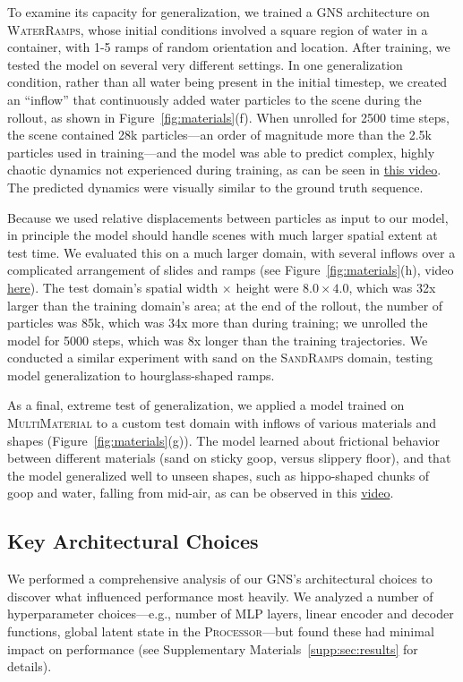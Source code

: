 \documentclass{article}
\newcommand\figref[1]{Figure~\ref{#1}}
\newcommand\domain[1]{\textsc{#1}}
\newcommand{\processor}{\textsc{Processor}}
\newcommand\vidgenvortex[1]{\href{http://tny.sh/tWNrMBg}{#1}}
\newcommand\vidgenramps[1]{\href{http://tny.sh/2fmmUfN}{#1}}
\newcommand\vidgenmulti[1]{\href{http://tny.sh/C0TUQH7}{#1}}
\begin{document}
To examine its capacity for generalization, we trained a GNS architecture on \domain{WaterRamps}, whose initial conditions involved a square region of water in a container, with 1-5 ramps of random orientation and location. After training, we tested the model on several very different settings. In one generalization condition, rather than all water being present in the initial timestep, we created an ``inflow'' that continuously added water particles to the scene during the rollout, as shown in \figref{fig:materials}(f). When unrolled for 2500 time steps, the scene contained 28k particles---an order of magnitude more than the 2.5k particles used in training---and the model was able to predict complex, highly chaotic dynamics not experienced during training, as can be seen in \vidgenvortex{this video}. The predicted dynamics were visually similar to the ground truth sequence.

Because we used relative displacements between particles as input to our model, in principle the model should handle scenes with much larger spatial extent at test time. We evaluated this on a much larger domain, with several inflows over a complicated arrangement of slides and ramps (see \figref{fig:materials}(h), video \vidgenramps{here}). The test domain's spatial width $\times$ height were $8.0 \times 4.0$, which was 32x larger than the training domain's area; at the end of the rollout, the number of particles was 85k, which was 34x more than during training; we unrolled the model for 5000 steps, which was 8x longer than the training trajectories. We conducted a similar experiment with sand on the \domain{SandRamps} domain, testing model generalization to hourglass-shaped ramps. 

As a final, extreme test of generalization, we applied a model trained on \domain{MultiMaterial} to a custom test domain with inflows of various materials and shapes (\figref{fig:materials}(g)). The model learned about frictional behavior between different materials (sand on sticky goop, versus slippery floor), and that the model generalized well to unseen shapes, such as hippo-shaped chunks of goop and water, falling from mid-air, as can be observed in this \vidgenmulti{video}.


\subsection{Key Architectural Choices}
\label{sec:results:ablations}

We performed a comprehensive analysis of our GNS's architectural choices to discover what influenced performance most heavily. We analyzed a number of hyperparameter choices---e.g., number of MLP layers, linear encoder and decoder functions, global latent state in the \processor{}---but found these had minimal impact on performance (see Supplementary Materials~\ref{supp:sec:results} for details).
\end{document}
